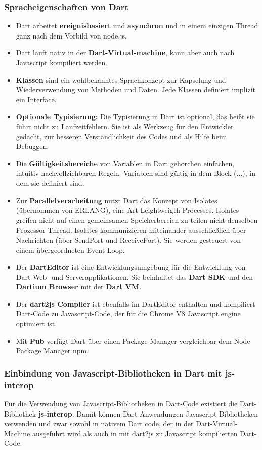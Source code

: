 \subsubsection{Spracheigenschaften von Dart}\label{s.Spracheigenschaften von Dart}
\begin{itemize}

\item Dart arbeitet {\bf ereignisbasiert} und {\bf asynchron} und in einem einzigen Thread ganz nach dem Vorbild von node.js.
\item  Dart läuft nativ in der {\bf Dart-Virtual-machine}, kann aber auch nach Javascript kompiliert werden.
 
\item {\bf Klassen } sind ein wohlbekanntes Sprachkonzept zur Kapselung und Wiederverwendung von Methoden und Daten. Jede Klassen definiert implizit ein Interface.
\item {\bf Optionale Typisierung:}
Die Typisierung in Dart ist optional, das heißt sie führt nicht zu Laufzeitfehlern. Sie ist als Werkzeug für den Entwickler gedacht, zur besseren Verständlichkeit des Codes und als Hilfe beim Debuggen.
\item Die  {\bf Gültigkeitsbereiche}
von Variablen in Dart gehorchen einfachen, intuitiv nachvollziehbaren Regeln: Variablen sind gültig in dem Block ({...}), in dem sie definiert sind.
\item
Zur {\bf Parallelverarbeitung} nutzt Dart das Konzept von Isolates (übernommen von ERLANG), eine Art Leightweigth Processes. Isolates greifen nicht auf einen gemeinsamen Speicherbereich zu teilen nicht denselben Prozessor-Thread. Isolates kommunizieren miteinander ausschließlich über Nachrichten (über SendPort und ReceivePort). Sie werden gesteuert von einem übergeordneten Event Loop.
\item Der {\bf DartEditor} ist eine Entwicklungsumgebung für die Entwicklung von Dart Web- und Serverapplikationen. Sie beinhaltet das {\bf Dart SDK } und den {\bf Dartium Browser} mit der {\bf Dart VM}.
\item Der {\bf dart2js Compiler} ist ebenfalls im DartEditor enthalten und kompiliert Dart-Code zu Javascript-Code, der für die Chrome V8 Javascript engine optimiert ist.
\item Mit {\bf Pub} verfügt Dart über einen Package Manager vergleichbar dem Node Package Manager npm.
\end{itemize}


\subsubsection{Einbindung von Javascript-Bibliotheken in Dart mit js-interop}\label{s.Einbindung von Javascript-Bibliotheken in Dart mit js-interop}
Für die Verwendung von Javascript-Bibliotheken in Dart-Code existiert die Dart-Bibliothek {\bf js-interop}. Damit können Dart-Anwendungen Javascript-Bibliotheken verwenden und zwar sowohl in nativem Dart code, der in der Dart-Virtual-Machine ausgeführt wird als auch in mit dart2js zu Javascript kompilierten Dart-Code.\\

